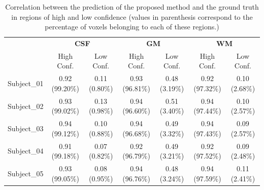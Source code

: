 \documentclass[twoside,espcrc2]{elsarticle}
\begin{document}


\begin{table}[ht!]
\footnotesize
\centering
\caption{Correlation between the prediction of the proposed method and the ground truth in regions of high and low confidence (values in parenthesis correspond to the percentage of voxels belonging to each of these regions.)}
\label{tab:correlation}
\begin{tabular}{lcccccc}
\toprule
 & \multicolumn{2}{c}{\textbf{CSF}} & \multicolumn{2}{c}{\textbf{GM}} & \multicolumn{2}{c}{\textbf{WM}} \\ 
\cmidrule(lr){2-3}\cmidrule(lr){4-5}\cmidrule(lr){6-7}
& High Conf. & Low Conf. & High Conf. & Low Conf. & High Conf. & Low Conf.  \\ 
\midrule\midrule
Subject\_01 &  0.92 (99.20$\%$) & 0.11 (0.80$\%$)   & 0.93 (96.81$\%$) &  0.48 (3.19$\%$) & 0.92 (97.32$\%$) &  0.10 (2.68$\%$)  \\
Subject\_02 &  0.93 (99.02$\%$) &  0.13 (0.98$\%$)  & 0.94 (96.60$\%$) & 0.51 (3.40$\%$) & 0.94 (97.44$\%$) &  0.10 (2.57$\%$) \\
Subject\_03 &  0.94 (99.12$\%$) & 0.10 (0.88$\%$)  & 0.94 (96.68$\%$)  & 0.49 (3.32$\%$)  & 0.94 (97.43$\%$) & 0.09 (2.57$\%$)   \\
Subject\_04 & 0.91 (99.18$\%$) & 0.07 (0.82$\%$)  & 0.92 (96.79$\%$)   &  0.49 (3.21$\%$)&  0.92 (97.52$\%$) & 0.09 (2.48$\%$)    \\
Subject\_05 & 0.93 (99.05$\%$)   &  0.08 (0.95$\%$)  & 0.94 (96.76$\%$)  & 0.48 (3.24$\%$) & 0.94 (97.59$\%$) &  0.11 (2.41$\%$)                \\ 
\bottomrule
\end{tabular}
\end{table}
\end{document}
